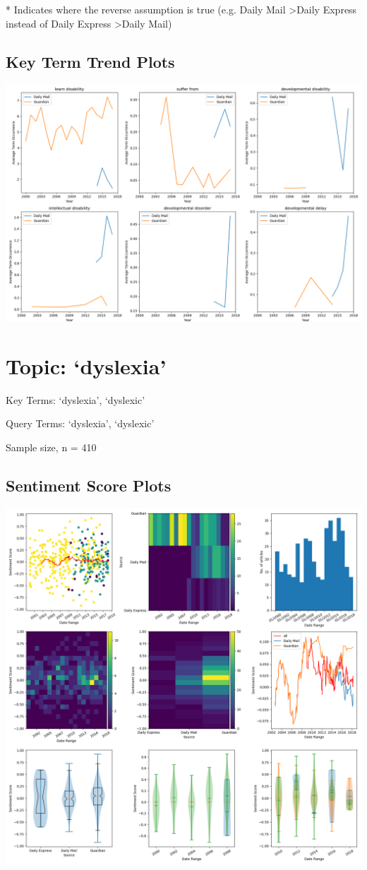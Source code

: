 \documentclass{report}
\begin{document}
\noindent ** Indicates where the reverse assumption is true (e.g. Daily Mail \textgreater\space Daily Express instead of Daily Express \textgreater\space Daily Mail)

\subsection{Key Term Trend Plots}
\includegraphics[width=\textwidth]{raw/developmental-delay-terms.png}

\newpage
\section{Topic: `dyslexia'}
Key Terms: `dyslexia', `dyslexic'

\noindent Query Terms: `dyslexia', `dyslexic'

\noindent Sample size, n = 410

\subsection{Sentiment Score Plots}
\includegraphics[width=\textwidth]{raw/dyslexia.png}
\end{document}
